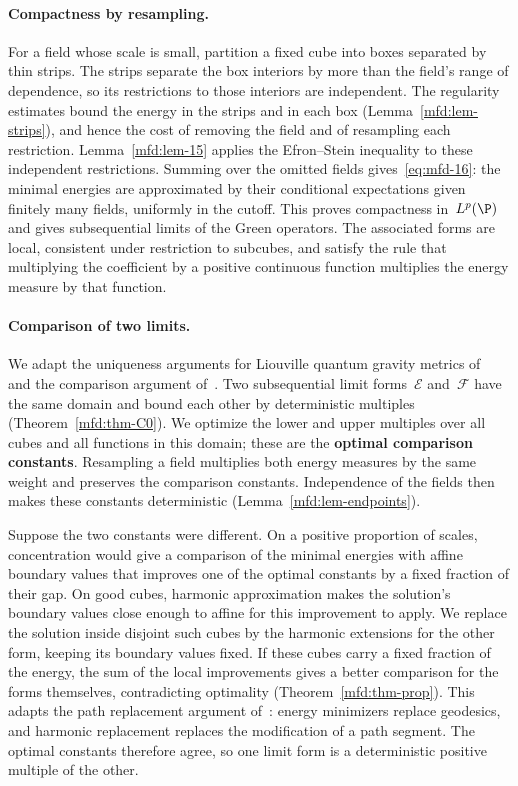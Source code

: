 \documentclass[11pt]{amsart}
\begin{document}
\paragraph{Compactness by resampling.}
For a field whose scale is small, partition a fixed cube into boxes separated by thin strips. The strips separate the box interiors by more than the field's range of dependence, so its restrictions to those interiors are independent. The regularity estimates bound the energy in the strips and in each box (Lemma~\ref{mfd:lem-strips}), and hence the cost of removing the field and of resampling each restriction. Lemma~\ref{mfd:lem-15} applies the Efron--Stein inequality to these independent restrictions. Summing over the omitted fields gives~\eqref{eq:mfd-16}: the minimal energies are approximated by their conditional expectations given finitely many fields, uniformly in the cutoff. This proves compactness in~$L^p(\P)$ and gives subsequential limits of the Green operators. The associated forms are local, consistent under restriction to subcubes, and satisfy the rule that multiplying the coefficient by a positive continuous function multiplies the energy measure by that function.

\paragraph{Comparison of two limits.}
We adapt the uniqueness arguments for Liouville quantum gravity metrics of~\citet{GM,DGUniqueness} and the comparison argument of~\citet{DGComparison}. Two subsequential limit forms~$\mathscr E$ and~$\mathscr F$ have the same domain and bound each other by deterministic multiples (Theorem~\ref{mfd:thm-C0}). We optimize the lower and upper multiples over all cubes and all functions in this domain; these are the \textbf{optimal comparison constants}. Resampling a field multiplies both energy measures by the same weight and preserves the comparison constants. Independence of the fields then makes these constants deterministic (Lemma~\ref{mfd:lem-endpoints}).

Suppose the two constants were different. On a positive proportion of scales, concentration would give a comparison of the minimal energies with affine boundary values that improves one of the optimal constants by a fixed fraction of their gap. On good cubes, harmonic approximation makes the solution's boundary values close enough to affine for this improvement to apply. We replace the solution inside disjoint such cubes by the harmonic extensions for the other form, keeping its boundary values fixed. If these cubes carry a fixed fraction of the energy, the sum of the local improvements gives a better comparison for the forms themselves, contradicting optimality (Theorem~\ref{mfd:thm-prop}). This adapts the path replacement argument of~\citet*[Theorem~1.9]{GM}: energy minimizers replace geodesics, and harmonic replacement replaces the modification of a path segment. The optimal constants therefore agree, so one limit form is a deterministic positive multiple of the other.
\end{document}
